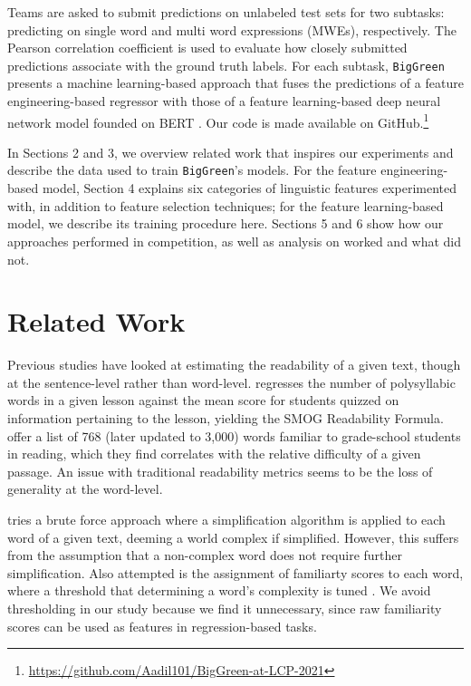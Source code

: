 \documentclass[11pt,a4paper]{article}
\begin{document}
Teams are asked to submit predictions on unlabeled test sets for two subtasks: predicting on single word and multi word expressions (MWEs), respectively. The Pearson correlation coefficient is used to evaluate how closely submitted predictions associate with the ground truth labels. For each subtask, \texttt{BigGreen} presents a machine learning-based approach that fuses the predictions of a feature engineering-based regressor with those of a feature learning-based deep neural network model founded on BERT \citep{DBLP:journals/corr/abs-1810-04805}. Our code is made available on GitHub.\footnote{\url{https://github.com/Aadil101/BigGreen-at-LCP-2021}}

In Sections 2 and 3, we overview related work that inspires our experiments and describe the data used to train \texttt{BigGreen}'s models. For the feature engineering-based model, Section 4 explains six categories of linguistic features experimented with, in addition to feature selection techniques; for the feature learning-based model, we describe its training procedure here. Sections 5 and 6 show how our approaches performed in competition, as well as analysis on worked and what did not.

\section{Related Work}

Previous studies have looked at estimating the readability of a given text, though at the sentence-level rather than word-level. \citet{10.2307/40011226} regresses the number of polysyllabic words in a given lesson against the mean score for students quizzed on information pertaining to the lesson, yielding the SMOG Readability Formula. \citet{10.2307/1473169} offer a list of 768 (later updated to 3,000) words familiar to grade-school students in reading, which they find correlates with the relative difficulty of a given passage. An issue with traditional readability metrics seems to be the loss of generality at the word-level.

\citet{shardlow2013comparison} tries a brute force approach where a simplification algorithm is applied to each word of a given text, deeming a world complex if simplified. However, this suffers from the assumption that a non-complex word does not require further simplification. Also attempted is the assignment of familiarty scores to each word, where a threshold that determining a word's complexity is tuned \citep{shardlow2013comparison}. We avoid thresholding in our study because we find it unnecessary, since raw familiarity scores can be used as features in regression-based tasks. 
\end{document}
